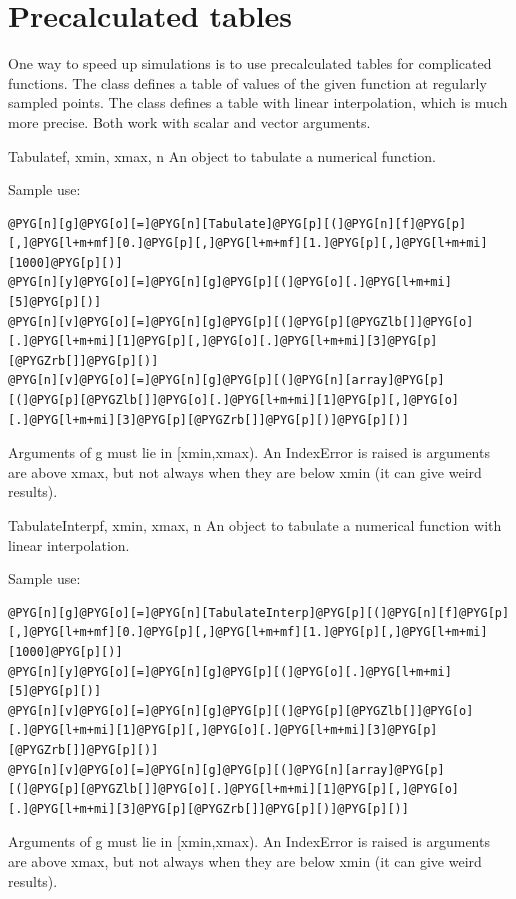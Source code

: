 \documentclass[letterpaper,10pt,english]{manual}
\begin{document}
\resetcurrentobjects
\hypertarget{--doc-tabulate}{}

\section{Precalculated tables}

One way to speed up simulations is to use precalculated tables for complicated
functions. The \hyperlink{brian.Tabulate}{} class defines a table of values of the
given function at regularly sampled points. The \hyperlink{brian.TabulateInterp}{} class
defines a table with linear interpolation, which is much more precise. Both work
with scalar and vector arguments.

\hypertarget{brian.Tabulate}{}\begin{classdesc}{Tabulate}{f, xmin, xmax, n}
An object to tabulate a numerical function.

Sample use:

\begin{Verbatim}[commandchars=@\[\]]
@PYG[n][g]@PYG[o][=]@PYG[n][Tabulate]@PYG[p][(]@PYG[n][f]@PYG[p][,]@PYG[l+m+mf][0.]@PYG[p][,]@PYG[l+m+mf][1.]@PYG[p][,]@PYG[l+m+mi][1000]@PYG[p][)]
@PYG[n][y]@PYG[o][=]@PYG[n][g]@PYG[p][(]@PYG[o][.]@PYG[l+m+mi][5]@PYG[p][)]
@PYG[n][v]@PYG[o][=]@PYG[n][g]@PYG[p][(]@PYG[p][@PYGZlb[]]@PYG[o][.]@PYG[l+m+mi][1]@PYG[p][,]@PYG[o][.]@PYG[l+m+mi][3]@PYG[p][@PYGZrb[]]@PYG[p][)]
@PYG[n][v]@PYG[o][=]@PYG[n][g]@PYG[p][(]@PYG[n][array]@PYG[p][(]@PYG[p][@PYGZlb[]]@PYG[o][.]@PYG[l+m+mi][1]@PYG[p][,]@PYG[o][.]@PYG[l+m+mi][3]@PYG[p][@PYGZrb[]]@PYG[p][)]@PYG[p][)]
\end{Verbatim}

Arguments of g must lie in {[}xmin,xmax).
An IndexError is raised is arguments are above xmax, but
not always when they are below xmin (it can give weird results).
\end{classdesc}

\hypertarget{brian.TabulateInterp}{}\begin{classdesc}{TabulateInterp}{f, xmin, xmax, n}
An object to tabulate a numerical function with linear interpolation.

Sample use:

\begin{Verbatim}[commandchars=@\[\]]
@PYG[n][g]@PYG[o][=]@PYG[n][TabulateInterp]@PYG[p][(]@PYG[n][f]@PYG[p][,]@PYG[l+m+mf][0.]@PYG[p][,]@PYG[l+m+mf][1.]@PYG[p][,]@PYG[l+m+mi][1000]@PYG[p][)]
@PYG[n][y]@PYG[o][=]@PYG[n][g]@PYG[p][(]@PYG[o][.]@PYG[l+m+mi][5]@PYG[p][)]
@PYG[n][v]@PYG[o][=]@PYG[n][g]@PYG[p][(]@PYG[p][@PYGZlb[]]@PYG[o][.]@PYG[l+m+mi][1]@PYG[p][,]@PYG[o][.]@PYG[l+m+mi][3]@PYG[p][@PYGZrb[]]@PYG[p][)]
@PYG[n][v]@PYG[o][=]@PYG[n][g]@PYG[p][(]@PYG[n][array]@PYG[p][(]@PYG[p][@PYGZlb[]]@PYG[o][.]@PYG[l+m+mi][1]@PYG[p][,]@PYG[o][.]@PYG[l+m+mi][3]@PYG[p][@PYGZrb[]]@PYG[p][)]@PYG[p][)]
\end{Verbatim}

Arguments of g must lie in {[}xmin,xmax).
An IndexError is raised is arguments are above xmax, but
not always when they are below xmin (it can give weird results).
\end{classdesc}
\end{document}
